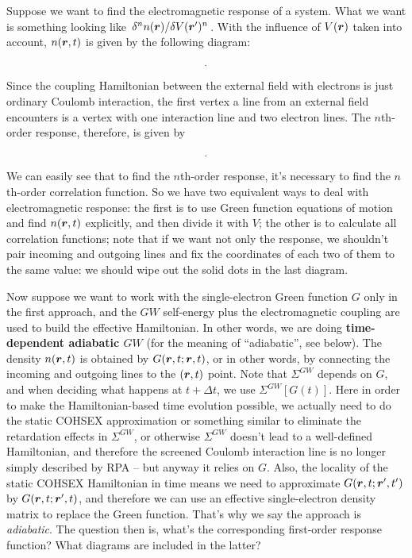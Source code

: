 \documentclass[hyperref, a4paper, 12pt]{report}
\newcommand*{\concept}[1]{{\textbf{#1}}}
\begin{document}
Suppose we want to find the electromagnetic response of a system. 
What we want is something looking like $\fdv*[n]{n(\vb*{r})}{V(\vb*{r}')}$.
With the influence of $V(\vb*{r})$ taken into account, 
$n(\vb*{r}, t)$ is given by the following diagram: 
\[
    \protect.
\]
Since the coupling Hamiltonian between the external field with electrons 
is just ordinary Coulomb interaction, 
the first vertex a line from an external field encounters 
is a vertex with one interaction line and two electron lines.
The $n$th-order response, therefore, is given by 
\[
    \protect.
\]
We can easily see that to find the $n$th-order response,
it's necessary to find the $n$th-order correlation function.
So we have two equivalent ways to deal with electromagnetic response: 
the first is to use Green function equations of motion 
and find $n(\vb*{r}, t)$ explicitly,
and then divide it with $V$;
the other is to calculate all correlation functions;
note that if we want not only the response, 
we shouldn't pair incoming and outgoing lines 
and fix the coordinates of each two of them to the same value:
we should wipe out the solid dots in the last diagram.

Now suppose we want to work with the single-electron Green function $G$ only
in the first approach,
and the $GW$ self-energy plus the electromagnetic coupling 
are used to build the effective Hamiltonian. 
In other words, we are doing \concept{time-dependent adiabatic $GW$} 
(for the meaning of ``adiabatic'', see below).
The density $n(\vb*{r}, t)$ is obtained by $G(\vb*{r}, t; \vb*{r}, t)$,
or in other words, 
by connecting the incoming and outgoing lines to the $(\vb*{r}, t)$ point.
Note that $\Sigma^{GW}$ depends on $G$,
and when deciding what happens at $t + \Delta t$,
we use $\Sigma^{GW}[G(t)]$.
Here in order to make the Hamiltonian-based time evolution possible, 
we actually need to do the static COHSEX approximation or something similar 
to eliminate the retardation effects in $\Sigma^{GW}$,
or otherwise $\Sigma^{GW}$ doesn't lead to a well-defined Hamiltonian,
and therefore the screened Coulomb interaction line is no longer 
simply described by RPA
-- but anyway it relies on $G$.
Also, the locality of the static COHSEX Hamiltonian in time 
means we need to approximate $G(\vb*{r}, t; \vb*{r}', t')$
by $G(\vb*{r}, t; \vb*{r}', t)$,
and therefore we can use an effective single-electron density matrix 
to replace the Green function.
That's why we say the approach is \emph{adiabatic}.
The question then is, 
what's the corresponding first-order response function?
What diagrams are included in the latter? 
\end{document}

